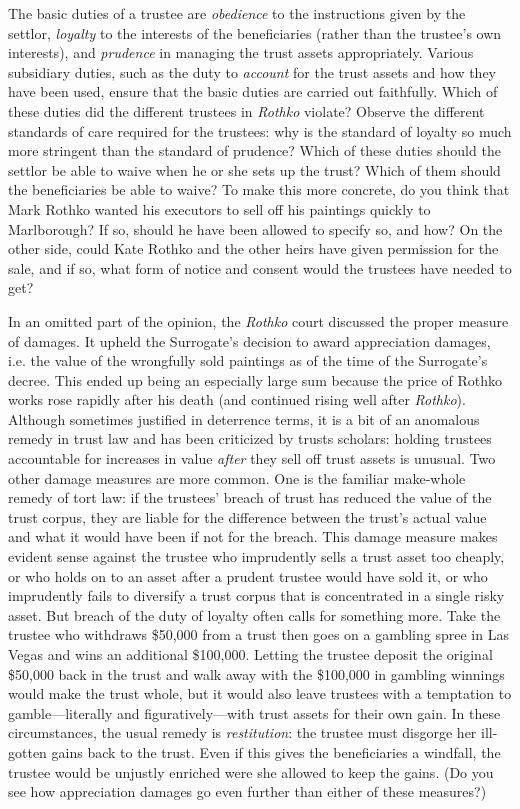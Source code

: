 \item The basic duties of a trustee are \textit{obedience} to the instructions
given by the settlor, \textit{loyalty} to the interests of the beneficiaries
(rather than the trustee's own interests), and \textit{prudence} in managing the
trust assets appropriately. Various subsidiary duties, such as the duty to
\textit{account} for the trust assets and how they have been used, ensure that
the basic duties are carried out faithfully. Which of these duties did the
different trustees in \textit{Rothko} violate? Observe the different standards
of care required for the trustees: why is the standard of loyalty so much more
stringent than the standard of prudence? Which of these duties should the
settlor be able to waive when he or she sets up the trust? Which of them should
the beneficiaries be able to waive? To make this more concrete, do you think
that Mark Rothko wanted his executors to sell off his paintings quickly to
Marlborough? If so, should he have been allowed to specify so, and how? On the
other side, could Kate Rothko and the other heirs have given permission for the
sale, and if so, what form of notice and consent would the trustees have needed
to get?

\item In an omitted part of the opinion, the \textit{Rothko} court discussed the
proper measure of damages. It upheld the Surrogate's decision to award
appreciation damages, i.e. the value of the wrongfully sold paintings as of the
time of the Surrogate's decree. This ended up being an especially large sum
because the price of Rothko works rose rapidly after his death (and continued
rising well after \textit{Rothko}). Although sometimes justified in deterrence
terms, it is a bit of an anomalous remedy in trust law and has been criticized
by trusts scholars: holding trustees accountable for increases in value
\textit{after} they sell off trust assets is unusual. Two other damage measures
are more common. One is the familiar make-whole remedy of tort law: if the
trustees' breach of trust has reduced the value of the trust corpus, they are
liable for the difference between the trust's actual value and what it would
have been if not for the breach. This damage measure makes evident sense against
the trustee who imprudently sells a trust asset too cheaply, or who holds on to
an asset after a prudent trustee would have sold it, or who imprudently fails to
diversify a trust corpus that is concentrated in a single risky asset. But
breach of the duty of loyalty often calls for something more. Take the trustee
who withdraws \$50,000 from a trust then goes on a gambling spree in Las Vegas
and wins an additional \$100,000. Letting the trustee deposit the original
\$50,000 back in the trust and walk away with the \$100,000 in gambling winnings
would make the trust whole, but it would also leave trustees with a temptation
to gamble---literally and figuratively---with trust assets for their own
gain. In these circumstances, the usual remedy is \textit{restitution}: the
trustee must disgorge her ill-gotten gains back to the trust. Even if this gives
the beneficiaries a windfall, the trustee would be unjustly enriched were she
allowed to keep the gains. (Do you see how appreciation damages go even further
than either of these measures?) 


